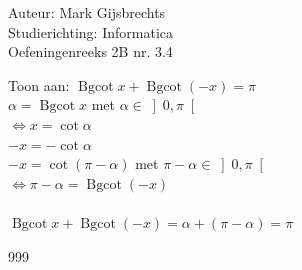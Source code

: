 \documentclass[a4paper]{article}
\newcommand{\Bgcot}{\operatorname{Bgcot}}
\begin{document}
\noindent \large Auteur: Mark Gijsbrechts \\
\noindent \large Studierichting: Informatica\\
\noindent \large Oefeningenreeks 2B nr. 3.4\\

\medskip

\normalsize



Toon aan: $\Bgcot x + \Bgcot (-x) = \pi$ \\

$\alpha = \Bgcot x$ met $\alpha \in \left] 0, \pi \right[$ \\

$\Leftrightarrow x = \cot \alpha$ \\

$ -x = -\cot \alpha$ \\

$ -x = \cot(\pi - \alpha)$ met $\pi - \alpha \in \left] 0, \pi \right[$ \\

$\Leftrightarrow \pi - \alpha = \Bgcot(-x)$ \\ \\

$\Bgcot x + \Bgcot (-x) = \alpha + \left(\pi - \alpha\right) = \pi$ \\


\begin{thebibliography}{999}
\end{thebibliography}
\end{document}
